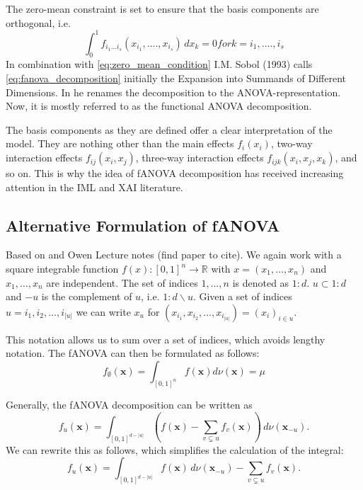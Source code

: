 The zero-mean constraint is set to ensure that the basis components are orthogonal, i.e.
\begin{equation}
    \int_{0}^{1} f_{i_{1}...i_{s}} (x_{i_{1}}, ...., x_{i_{s}}) \, dx_k = 0 for k = i_1, ...., i_s
    \label{eq:zero_mean_condition}
\end{equation}
In combination with \autoref{eq:zero_mean_condition} I.M. Sobol (1993) calls \autoref{eq:fanova_decomposition} initially the \ldq Expansion into Summands of Different Dimensions\rdq. In \cite{sobol_global_2001} he renames the decomposition to the \ldq ANOVA-representation\rdq. Now, it is mostly referred to as the \ldq functional ANOVA decomposition\rdq \citep{hooker_discovering_2004}.\par
The basis components as they are defined offer a clear interpretation of the model. They are nothing other than the main effects $f_i(x_i)$, two-way interaction effects $f_{ij}(x_i,x_j)$, three-way interaction effects $f_{ijk}(x_i,x_j,x_k)$, and so on. This is why the idea of fANOVA decomposition has received increasing attention in the IML and XAI literature.\par

\subsection*{Alternative Formulation of fANOVA}
Based on \cite{hooker_discovering_2004} and Owen Lecture notes (find paper to cite).
We again work with a square integrable function $f(x): [0, 1]^n \rightarrow \mathbb{R}$ with $x = (x_1, \dots, x_n)$ and $x_1, \dots, x_n$ are independent.
The set of indices $1, \dots, n$ is denoted as $1\colon d$. $u \subset 1\colon d$ and $-u$ is the complement of $u$, i.e. $1\colon d \backslash u$.
Given a set of indices $u = {i_1, i_2, \dots, i_{|u|}}$ we can write $x_u$ for $(x_{i_1}, x_{i_2}, \dots, x_{i_{|u|}}) = (x_i)_{i \in u}$.\par

This notation allows us to sum over a set of indices, which avoids lengthy notation. The fANOVA can then be formulated as follows:
\begin{equation}
    f_{\emptyset}(\mathbf{x}) = \int_{[0, 1]^n} f(\mathbf{x}) d\nu(\mathbf{x}) = \mu
\end{equation}

Generally, the fANOVA decomposition can be written as
\begin{equation}
    f_u(\mathbf{x}) = \int_{[0,1]^{d - |u|}} \left( f(\mathbf{x}) - \sum_{v \subsetneq u} f_v(\mathbf{x}) \right) \, d\nu(\mathbf{x}_{-u}).
\end{equation}
We can rewrite this as follows, which simplifies the calculation of the integral:
\begin{equation}
    f_u(\mathbf{x}) = \int_{[0,1]^{d - |u|}} f(\mathbf{x}) \, d\nu(\mathbf{x}_{-u}) - \sum_{v \subsetneq u} f_v(\mathbf{x}).
\end{equation}

